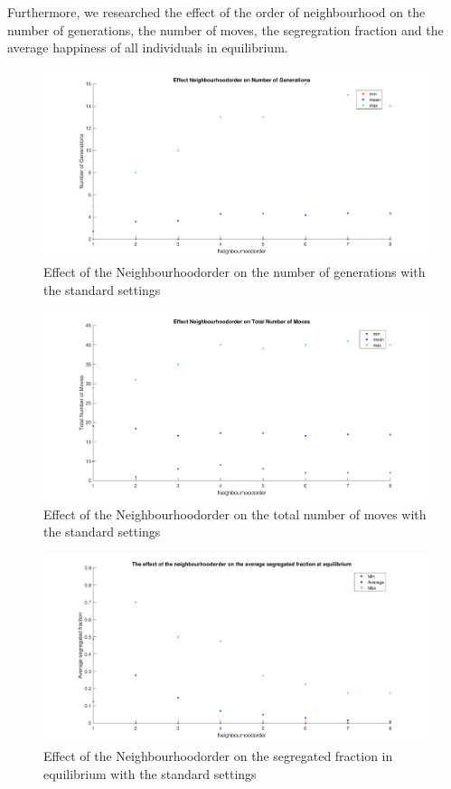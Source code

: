 Furthermore, we researched the effect of the order of neighbourhood on the number of generations, the number of moves, the segregration fraction and the average happiness of all individuals in equilibrium.

\begin{figure}[H]
	\centering
    \includegraphics[width=\textwidth]{buurtorde-aantgen.pdf}
    \caption{Effect of the Neighbourhoodorder on the number of generations with the standard settings}
    \label{fig:AantGenS}
\end{figure}

\begin{figure}[H]
	\centering
    \includegraphics[width=\textwidth]{buurtorde-aantmov.pdf}
    \caption{Effect of the Neighbourhoodorder on the total number of moves with the standard settings}
    \label{fig:AantGenS}
\end{figure}

\begin{figure}[H]
	\centering
    \includegraphics[width=\textwidth]{buurtorde-segreind.pdf}
    \caption{Effect of the Neighbourhoodorder on the segregated fraction in equilibrium with the standard settings}
    \label{fig:AantGenS}
\end{figure}

